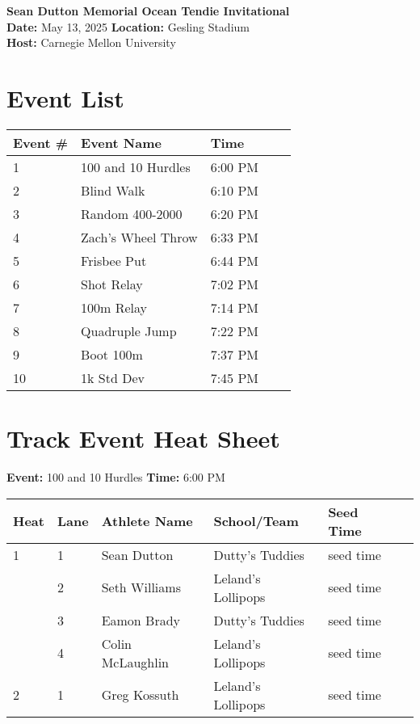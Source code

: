 \documentclass[11pt]{article}
\begin{document}
\begin{center}
    \LARGE \textbf{Sean Dutton Memorial Ocean Tendie Invitational} \\
    \large
    \vspace{0.5em}
    \textbf{Date:} May 13, 2025 \hspace{2cm} \textbf{Location:} Gesling Stadium \\
    \textbf{Host:} Carnegie Mellon University
\end{center}

\vspace{1em}

\section*{Event List}

\begin{tabular}{@{}lllll@{}}
\toprule
\textbf{Event \#} & \textbf{Event Name} &  \textbf{Time} \\
\midrule
1 & 100 and 10 Hurdles & 6:00 PM \\
2 & Blind Walk & 6:10 PM \\
3 & Random 400-2000 & 6:20 PM \\
4 & Zach's Wheel Throw & 6:33 PM \\
5 & Frisbee Put & 6:44 PM \\
6 & Shot Relay & 7:02 PM \\
7 & 100m Relay & 7:14 PM \\
8 & Quadruple Jump & 7:22 PM \\
9 & Boot 100m & 7:37 PM \\
10 & 1k Std Dev & 7:45 PM \\
\bottomrule
\end{tabular}



\vspace{2em}

\section*{Track Event Heat Sheet}


\textbf{Event:} 100 and 10 Hurdles \quad \textbf{Time:} 6:00 PM 

\vspace{1em}
\begin{tabular}{@{}llllll@{}}
\toprule
\textbf{{Heat}} &
\textbf{Lane} & \textbf{Athlete Name} & \textbf{School/Team} & \textbf{Seed Time} \\
\midrule
1 & 1 & Sean Dutton & Dutty's Tuddies & seed time &\\
 & 2 & Seth Williams & Leland's Lollipops & seed time &\\
 & 3 & Eamon Brady & Dutty's Tuddies & seed time &\\
 & 4 & Colin McLaughlin & Leland's Lollipops & seed time &\\
2 & 1 & Greg Kossuth & Leland's Lollipops & seed time &\\
\bottomrule
\end{tabular}
\vspace{2.5em}
\end{document}
